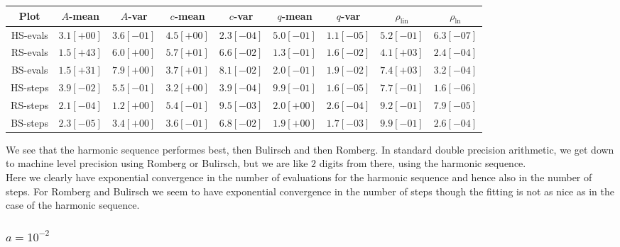 \begin{table}[H]
    \centering
    \small
    \begin{tabular}{c||c|c|c|c|c|c|c|c}
Plot & \(A\)-mean & \(A\)-var & \(c\)-mean & \(c\)-var & \(q\)-mean & \(q\)-var & \(\rho_{\operatorname{lin}}\) & \(\rho_{\ln}\)\\\hline
\rowcolor{green}
HS-evals & \(3.1[+00]\) & \(3.6[-01]\) & \(4.5[+00]\) & \(2.3[-04]\) & \(5.0[-01]\) & \(1.1[-05]\) & \(5.2[-01]\) & \(6.3[-07]\) \\
\rowcolor{red}
RS-evals & \(1.5[+43]\) & \(6.0[+00]\) & \(5.7[+01]\) & \(6.6[-02]\) & \(1.3[-01]\) & \(1.6[-02]\) & \(4.1[+03]\) & \(2.4[-04]\) \\
\rowcolor{red}
BS-evals & \(1.5[+31]\) & \(7.9[+00]\) & \(3.7[+01]\) & \(8.1[-02]\) & \(2.0[-01]\) & \(1.9[-02]\) & \(7.4[+03]\) & \(3.2[-04]\) \\
\rowcolor{green}
HS-steps & \(3.9[-02]\) & \(5.5[-01]\) & \(3.2[+00]\) & \(3.9[-04]\) & \(9.9[-01]\) & \(1.6[-05]\) & \(7.7[-01]\) & \(1.6[-06]\) \\
\rowcolor{yellow}
RS-steps & \(2.1[-04]\) & \(1.2[+00]\) & \(5.4[-01]\) & \(9.5[-03]\) & \(2.0[+00]\) & \(2.6[-04]\) & \(9.2[-01]\) & \(7.9[-05]\) \\
\rowcolor{yellow}
BS-steps & \(2.3[-05]\) & \(3.4[+00]\) & \(3.6[-01]\) & \(6.8[-02]\) & \(1.9[+00]\) & \(1.7[-03]\) & \(9.9[-01]\) & \(2.6[-04]\) \\
	\end{tabular}
    \label{tab:my_label}
\end{table}

We see that the harmonic sequence performes best, then Bulirsch and then Romberg. In standard double precision arithmetic, we get down to machine level precision using Romberg or Bulirsch, but we are like \(2\) digits from there, using the harmonic sequence.\\

Here we clearly have exponential convergence in the number of evaluations for the harmonic sequence and hence also in the number of steps. For Romberg and Bulirsch we seem to have exponential convergence in the number of steps though the fitting is not as nice as in the case of the harmonic sequence.

\subsubsection{\(a= 10^{-2}\)}


